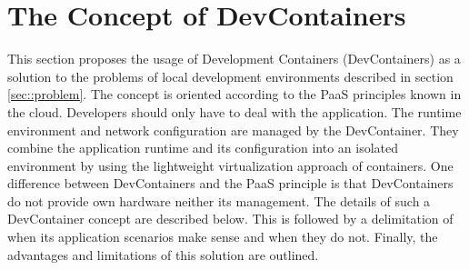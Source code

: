 

\section{The Concept of DevContainers}\label{sec::solution_concept}
This section proposes the usage of Development Containers (DevContainers) as a solution to the problems of local development environments described in section \ref{sec::problem}. The concept is oriented according to the \ac{PaaS} principles known in the cloud. Developers should only have to deal with the application. The runtime environment and network configuration are managed by the DevContainer. They combine the application runtime and its configuration into an isolated environment by using the lightweight virtualization approach of containers. One difference between DevContainers and the \ac{PaaS} principle is that DevContainers do not provide own hardware neither its management. \newline
The details of such a DevContainer concept are described below. This is followed by a delimitation of when its application scenarios make sense and when they do not. Finally, the advantages and limitations of this solution are outlined.

